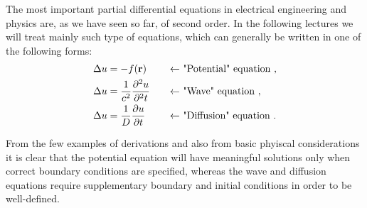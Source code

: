The most important partial differential equations in electrical engineering and physics are, as we have seen so far, of second order. In the following lectures we will treat mainly such type of equations, which can 
generally be written in one of the following forms:
\begin{alignat*}{2}
  \Delta u &= -f(\mathbf{r}) &\quad \leftarrow &\text{ "Potential" equation }, \\
  \Delta u &= \frac{1}{c^2}\frac{\partial^2 u}{\partial^2 t} &\quad \leftarrow &\text{ "Wave" equation },\\
  \Delta u &= \frac{1}{D}\frac{\partial u}{\partial t} &\quad \leftarrow &\text{ "Diffusion" equation }.\\
\end{alignat*}

From the few examples of derivations and also from basic phyiscal considerations it is clear that the potential equation will have meaningful solutions only when correct boundary conditions are specified, whereas the wave and diffusion equations require supplementary boundary and initial conditions in order to be well-defined. 

